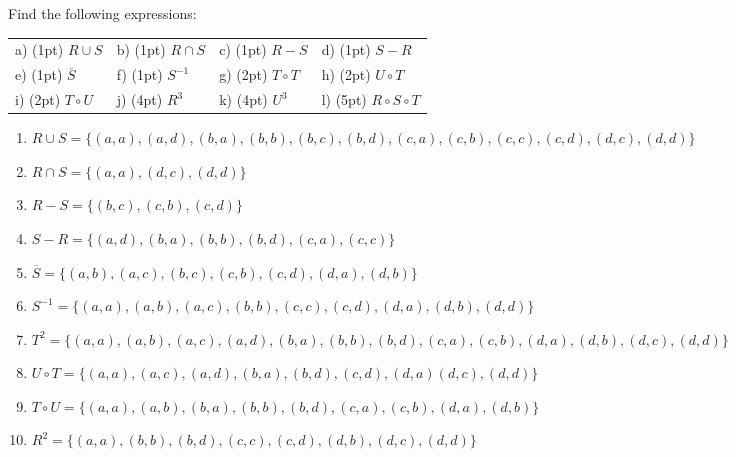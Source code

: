 \begin{questions}
 Find the following expressions: \\
\begin{tabular}{llll}
    a) (1pt) $R \cup S$ \hspace{0.3in} & b) (1pt) $R \cap S$  \hspace{0.3in}
        & c) (1pt) $R - S$ \hspace{0.3in} & d) (1pt) $S - R$\\
    e) (1pt) $\overline{S}$ \hspace{0.3in} & f) (1pt) $S^{-1}$
    & g) (2pt) $T \circ T$ & h) (2pt) $U \circ T$ \\
    i) (2pt) $T \circ U$ & j) (4pt) $R^3$ & k) (4pt) $U^3$  & l) (5pt) $R \circ S \circ T$\\
\end{tabular}
	\ifprintanswers
        \vspace{-10pt}
    \fi
    \begin{solution} %
    \begin{enumerate}[label=(\alph*),itemsep=3pt,parsep=0pt,topsep=0pt,partopsep=0pt]
        \item $R \cup S = \{(a,a), (a,d), (b,a), (b,b), (b,c), (b,d), (c,a), (c,b), (c,c), (c,d), (d,c), (d,d) \}$
        \item $R \cap S = \{ (a,a), (d,c), (d,d) \}$
        \item $R - S = \{(b,c), (c,b), (c,d) \}$
        \item $S - R = \{(a,d), (b,a), (b,b), (b,d), (c,a), (c,c) \}$
        \item $\overline{S} = \{ (a,b), (a,c), (b,c), (c,b), (c,d), (d,a), (d,b) \}$
        \item %
        $S^{-1} = \{(a,a), (a,b), (a,c), (b,b), (c,c), (c,d), (d,a), (d,b), (d,d) \}$
        \item %
        $T^2 = \{ (a,a), (a,b), (a,c), (a,d), (b,a), (b,b), (b,d), (c,a), (c,b), (d,a), (d,b), (d,c), (d,d) \}$
        \item $U \circ T = \{ (a,a), (a,c), (a,d), (b,a), (b,d), (c,d), (d,a)
        (d,c), (d,d) \}$
        \item $T \circ U = \{ (a,a), (a,b), (b,a), (b,b), (b,d), (c,a), (c,b), (d,a), (d,b) \}$
        \item $R^2 = \{ (a,a), (b,b), (b,d), (c,c), (c,d), (d,b), (d,c), (d,d) \}$ \\

\end{enumerate}
\end{solution}
\end{questions}
